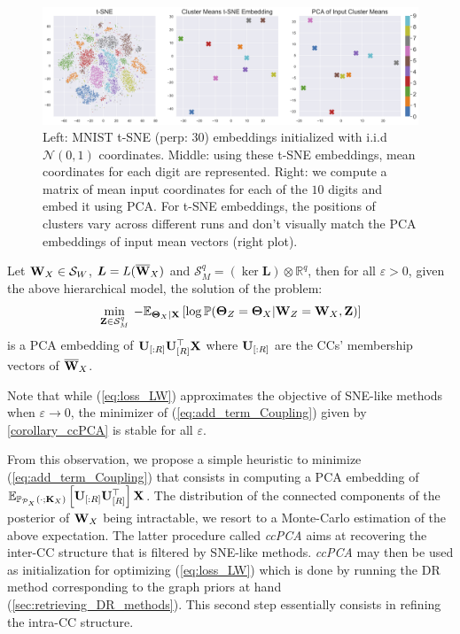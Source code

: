\begin{figure}
\begin{center}
\centerline{\includegraphics[width=0.5\columnwidth]{figures/GraphCoupling/tSNE_truth.png}}
\caption{Left: MNIST t-SNE (perp: 30) embeddings initialized with i.i.d $\mathcal{N}(0,1)$ coordinates. Middle: using these t-SNE embeddings, mean coordinates for each digit are represented. Right: we compute a matrix of mean input coordinates for each of the $10$ digits and embed it using PCA. For t-SNE embeddings, the positions of clusters vary across different runs and don't visually match the PCA embeddings of input mean vectors (right plot).}
\label{fig:tSNE-clusters-truth}
\end{center}
\end{figure}

\begin{corollary}\label{corollary_ccPCA}
Let $\mathbf{W}_{X} \in \mathcal{S}_{W}$, $\bm{L} = L(\overline{\mathbf{W}}_{X})$ and $\mathcal{S}^q_{M}= (\ker \bm{L}) \otimes \mathbb{R}^q$, then for all $\varepsilon > 0$, given the above hierarchical model, the solution of the problem:
$$\min_{\mathbf{Z} \in \mathcal{S}^q_{M}} \: -\mathbb{E}_{\bm{\Theta}_{X}| \mathbf{X}}\left[ \log \mathbb{P}(\bm{\Theta}_{Z} = \bm{\Theta}_{X}| \mathbf{W}_{Z} = \mathbf{W}_{X}, \mathbf{Z}) \right]$$
is a PCA embedding of $\mathbf{U}_{[:R]}\mathbf{U}_{[R]}^\top\mathbf{X}$ where $\mathbf{U}_{[:R]}$ are the CCs' membership vectors of $\overline{\mathbf{W}}_{X}$.
\end{corollary}

\begin{remark}
Note that while (\ref{eq:loss_LW}) approximates the objective of SNE-like methods when $\varepsilon \to 0$, the minimizer of (\ref{eq:add_term_Coupling}) given by \cref{corollary_ccPCA} is stable for all $\varepsilon$.
\end{remark}

From this observation, we propose a simple heuristic to minimize (\ref{eq:add_term_Coupling}) that consists in computing a PCA embedding of $\mathbb{E}_{\mathbb{P}_{\mathcal{P}_X}(\cdot;\mathbf{K}_{X})}\left[ \mathbf{U}_{[:R]}\mathbf{U}_{[R]}^\top \right]\mathbf{X}$. The distribution of the connected components of the posterior of $\mathbf{W}_{X}$ being intractable, we resort to a Monte-Carlo estimation of the above expectation. The latter procedure called \textit{ccPCA} aims at recovering the inter-CC structure that is filtered by SNE-like methods. \textit{ccPCA} may then be used as initialization for optimizing (\ref{eq:loss_LW}) which is done by running the DR method corresponding to the graph priors at hand (\cref{sec:retrieving_DR_methods}). This second step essentially consists in refining the intra-CC structure. 

